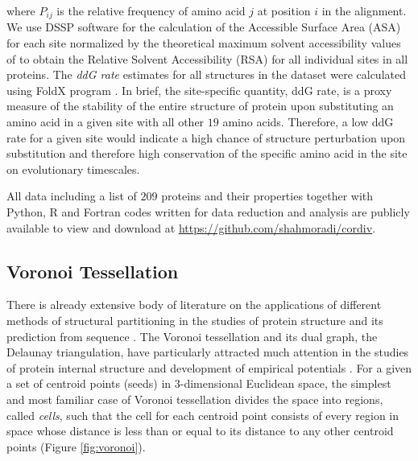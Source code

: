 \documentclass[11pt]{article}
\begin{document}
        where $P_{ij}$ is the relative frequency of amino acid $j$ at position $i$ in the alignment. We use DSSP software \citep[][]{kabsch_dictionary_1983} for the calculation of the Accessible Surface Area (ASA) for each site normalized by the theoretical maximum solvent accessibility values of \citet{tien_maximum_2013} to obtain the Relative Solvent Accessibility (RSA) for all individual sites in all proteins. The {\it ddG rate} estimates for all structures in the dataset were calculated using FoldX program \citep[c.f.,][ for details of the methodology employed]{echave_relationship_2014}. In brief, the site-specific quantity, ddG rate, is a proxy measure of the stability of the entire structure of protein upon substituting an amino acid in a given site with all other $19$ amino acids. Therefore, a low ddG rate for a given site would indicate a high chance of structure perturbation upon substitution and therefore high conservation of the specific amino acid in the site on evolutionary timescales.
		
        All data including a list of $209$ proteins and their properties together with Python, R and Fortran codes written for data reduction and analysis are publicly available to view and download at \url{https://github.com/shahmoradi/cordiv}.

    \subsection*{Voronoi Tessellation}

        There is already extensive body of literature on the applications of different methods of structural partitioning in the studies of protein structure and its prediction from sequence \citep[e.g., ][]{richards_interpretation_1974, gerstein_volume_1994}. The Voronoi tessellation and its dual graph, the Delaunay triangulation, have particularly attracted much attention in the studies of protein internal structure and development of empirical potentials \citep[e.g.,][]{zomorodian_geometric_2006, zhou_alpha_2014, xia_identifying_2014}. For a given a set of centroid points (seeds) in 3-dimensional Euclidean space, the simplest and most familiar case of Voronoi tessellation divides the space into regions, called {\it cells}, such that the cell for each centroid point consists of every region in space whose distance is less than or equal to its distance to any other centroid points (Figure \ref{fig:voronoi}). \\
\end{document}
